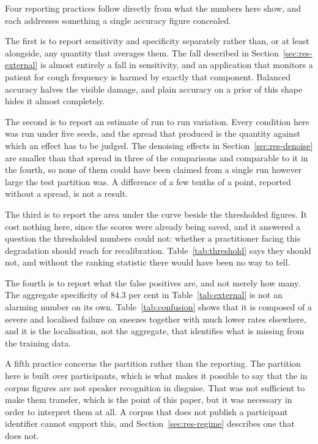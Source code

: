 \documentclass{ieeeaccess}
\begin{document}
Four reporting practices follow directly from what the numbers here show, and each
addresses something a single accuracy figure concealed.

The first is to report sensitivity and specificity separately rather than, or at least
alongside, any quantity that averages them. The fall described in
Section~\ref{sec:res-external} is almost entirely a fall in sensitivity, and an
application that monitors a patient for cough frequency is harmed by exactly that
component. Balanced accuracy halves the visible damage, and plain accuracy on a prior of
this shape hides it almost completely.

The second is to report an estimate of run to run variation. Every condition here was run
under five seeds, and the spread that produced is the quantity against which an effect has
to be judged. The denoising effects in Section~\ref{sec:res-denoise} are smaller than that
spread in three of the comparisons and comparable to it in the fourth, so none of them
could have been claimed from a single run however large the test partition was. A
difference of a few tenths of a point, reported without a spread, is not a result.

The third is to report the area under the curve beside the thresholded figures. It cost
nothing here, since the scores were already being saved, and it answered a question the
thresholded numbers could not: whether a practitioner facing this degradation should
reach for recalibration. Table~\ref{tab:threshold} says they should not, and without the
ranking statistic there would have been no way to tell.

The fourth is to report what the false positives are, and not merely how many. The
aggregate specificity of $84.3$ per cent in Table~\ref{tab:external} is not an alarming
number on its own. Table~\ref{tab:confusion} shows that it is composed of a severe and
localised failure on sneezes together with much lower rates elsewhere, and it is the
localisation, not the aggregate, that identifies what is missing from the training data.

A fifth practice concerns the partition rather than the reporting. The partition here is
built over participants, which is what makes it possible to say that the in corpus figures
are not speaker recognition in disguise. That was not sufficient to make them transfer,
which is the point of this paper, but it was necessary in order to interpret them at all.
A corpus that does not publish a participant identifier cannot support this, and
Section~\ref{sec:res-regime} describes one that does not.
\end{document}
